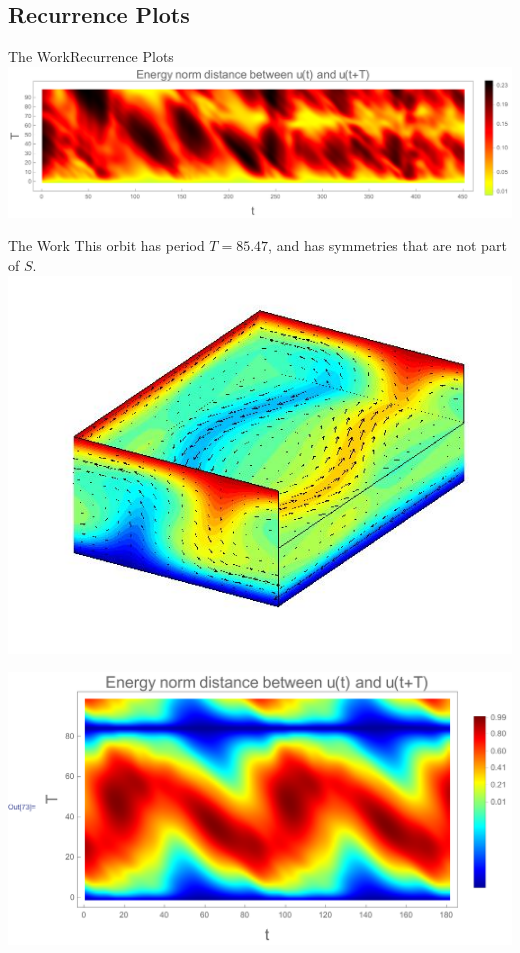 \documentclass[10pt]{beamer}
\begin{document}
\subsection{Recurrence Plots}
\begin{frame}{The Work}{Recurrence Plots}
\includegraphics[scale = 0.3]{Data/RecPlot}
\end{frame}
\begin{frame}{The Work}
This orbit has period $T = 85.47$, and has symmetries that are not part of $S$. 
\vbox{\includegraphics[scale=0.45]{Data/p85-47}}
\end{frame}
\begin{frame}
\vbox{\vspace{20mm}\includegraphics[scale=0.40]{Data/p85p47Rec}}
\end{frame}
\end{document}
